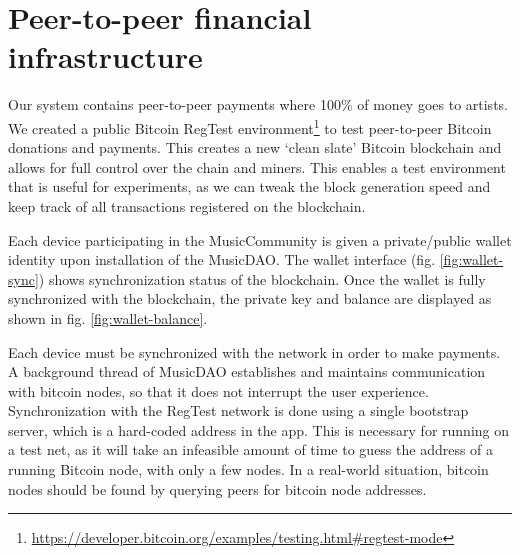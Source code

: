 \section{Peer-to-peer financial infrastructure}
\label{sec:regtest-network-impl}
Our system contains peer-to-peer payments where 100\% of money goes to artists. We created a public Bitcoin RegTest environment\footnote{\url{https://developer.bitcoin.org/examples/testing.html\#regtest-mode}} to test peer-to-peer Bitcoin donations and payments. This creates a new `clean slate' Bitcoin blockchain and allows for full control over the chain and miners. This enables a test environment that is useful for experiments, as we can tweak the block generation speed and keep track of all transactions registered on the blockchain.

Each device participating in the MusicCommunity is given a private/public wallet identity upon installation of the MusicDAO. The wallet interface (fig. \ref{fig:wallet-sync}) shows synchronization status of the blockchain. Once the wallet is fully synchronized with the blockchain, the private key and balance are displayed as shown in fig. \ref{fig:wallet-balance}. 

Each device must be synchronized with the network in order to make payments. A background thread of MusicDAO establishes and maintains communication with bitcoin nodes, so that it does not interrupt the user experience. Synchronization with the RegTest network is done using a single bootstrap server, which is a hard-coded address in the app. This is necessary for running on a test net, as it will take an infeasible amount of time to guess the address of a running Bitcoin node, with only a few nodes. In a real-world situation, bitcoin nodes should be found by querying peers for bitcoin node addresses.

